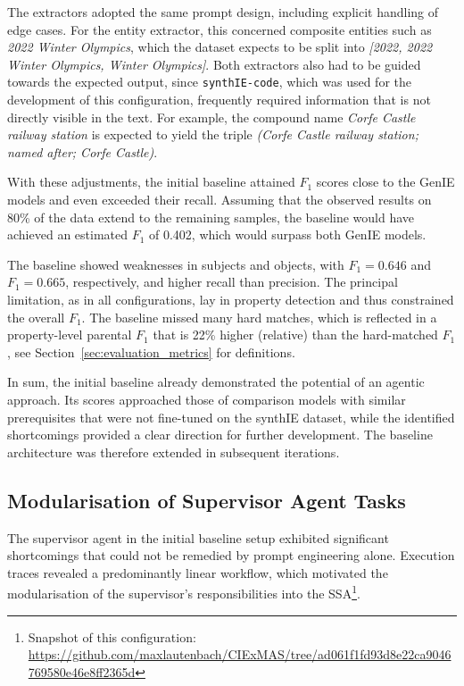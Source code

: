 \documentclass[a4paper,oneside,bibliography=totoc]{scrbook}
\begin{document}
The extractors adopted the same prompt design, including explicit handling of edge cases. For the entity extractor, this concerned composite entities such as \textit{2022 Winter Olympics}, which the dataset expects to be split into \textit{[2022, 2022 Winter Olympics, Winter Olympics]}. Both extractors also had to be guided towards the expected output, since \texttt{synthIE-code}, which was used for the development of this configuration, frequently required information that is not directly visible in the text. For example, the compound name \textit{Corfe Castle railway station} is expected to yield the triple \textit{(Corfe Castle railway station; named after; Corfe Castle)}.

With these adjustments, the initial baseline attained $F_{1}$ scores close to the GenIE models and even exceeded their recall. Assuming that the observed results on 80\% of the data extend to the remaining samples, the baseline would have achieved an estimated $F_{1}$ of 0.402, which would surpass both GenIE models.

The baseline showed weaknesses in subjects and objects, with $F_{1}=0.646$ and $F_{1}=0.665$, respectively, and higher recall than precision. The principal limitation, as in all configurations, lay in property detection and thus constrained the overall $F_{1}$. The baseline missed many hard matches, which is reflected in a property-level parental $F_{1}$ that is 22\% higher (relative) than the hard-matched $F_{1}$, see Section~\ref{sec:evaluation_metrics} for definitions.

In sum, the initial baseline already demonstrated the potential of an agentic approach. Its scores approached those of comparison models with similar prerequisites that were not fine-tuned on the synthIE dataset, while the identified shortcomings provided a clear direction for further development. The baseline architecture was therefore extended in subsequent iterations.

\subsection{Modularisation of Supervisor Agent Tasks}
\label{subsec:modularization_agent_tasks}

The supervisor agent in the initial baseline setup exhibited significant shortcomings that could not be remedied by prompt engineering alone. Execution traces revealed a predominantly linear workflow, which motivated the modularisation of the supervisor’s responsibilities into the \ac{SSA}\footnote{Snapshot of this configuration: \url{https://github.com/maxlautenbach/CIExMAS/tree/ad061f1fd93d8e22ca9046769580e46e8ff2365d}}.
\end{document}
